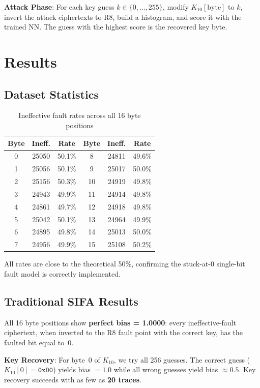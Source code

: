 \documentclass[11pt,a4paper]{article}
\begin{document}
\textbf{Attack Phase}: For each key guess $k \in \{0, \ldots, 255\}$, modify $K_{10}[\text{byte}]$ to $k$, invert the attack ciphertexts to R8, build a histogram, and score it with the trained NN. The guess with the highest score is the recovered key byte.

\section{Results}

\subsection{Dataset Statistics}

\begin{table}[H]
\centering
\caption{Ineffective fault rates across all 16 byte positions}
\begin{tabular}{ccc|ccc}
\toprule
\textbf{Byte} & \textbf{Ineff.} & \textbf{Rate} & \textbf{Byte} & \textbf{Ineff.} & \textbf{Rate} \\
\midrule
0  & 25050 & 50.1\% & 8  & 24811 & 49.6\% \\
1  & 25056 & 50.1\% & 9  & 25017 & 50.0\% \\
2  & 25156 & 50.3\% & 10 & 24919 & 49.8\% \\
3  & 24943 & 49.9\% & 11 & 24914 & 49.8\% \\
4  & 24861 & 49.7\% & 12 & 24918 & 49.8\% \\
5  & 25042 & 50.1\% & 13 & 24964 & 49.9\% \\
6  & 24895 & 49.8\% & 14 & 25013 & 50.0\% \\
7  & 24956 & 49.9\% & 15 & 25108 & 50.2\% \\
\bottomrule
\end{tabular}
\label{tab:ineff_rates}
\end{table}

All rates are close to the theoretical 50\%, confirming the stuck-at-0 single-bit fault model is correctly implemented.

\subsection{Traditional SIFA Results}

All 16 byte positions show \textbf{perfect bias = 1.0000}: every ineffective-fault ciphertext, when inverted to the R8 fault point with the correct key, has the faulted bit equal to~0.

\textbf{Key Recovery}: For byte~0 of $K_{10}$, we try all 256 guesses. The correct guess ($K_{10}[0] = \texttt{0xD0}$) yields bias $= 1.0$ while all wrong guesses yield bias $\approx 0.5$. Key recovery succeeds with as few as \textbf{20 traces}.
\end{document}
